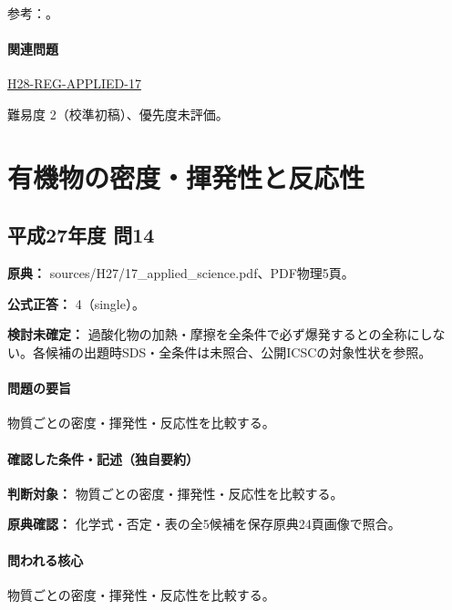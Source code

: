 \par 参考：\cite{organic_physical,organic_step,organic_jbpa}。

\paragraph{関連問題} \hyperref[q:h28-reg-applied-17]{H28-REG-APPLIED-17}

\par 難易度 2（校準初稿）、優先度未評価。

\section{有機物の密度・揮発性と反応性}

\subsection{平成27年度 問14}
\label{q:h27-reg-applied-14}

\noindent\textbf{原典：} sources/H27/17\_applied\_science.pdf、PDF物理5頁。

\textbf{公式正答：} 4（single）。

\par\textbf{検討未確定：} 過酸化物の加熱・摩擦を全条件で必ず爆発するとの全称にしない。各候補の出題時SDS・全条件は未照合、公開ICSCの対象性状を参照。

\paragraph{問題の要旨} 物質ごとの密度・揮発性・反応性を比較する。

\paragraph{確認した条件・記述（独自要約）}\mbox{}\par

\noindent\textbf{判断対象：} 物質ごとの密度・揮発性・反応性を比較する。\par

\noindent\textbf{原典確認：} 化学式・否定・表の全5候補を保存原典24頁画像で照合。\par

\paragraph{問われる核心} 物質ごとの密度・揮発性・反応性を比較する。

